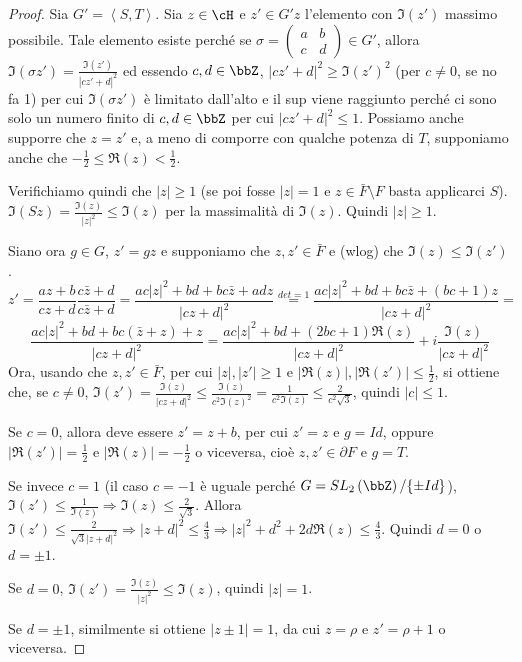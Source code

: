 \begin{proof}
Sia $G'=\left\langle S,T \right\rangle$. Sia $z \in \cH$ e $z' \in G'z$ l'elemento con $\Im(z')$ massimo possibile. Tale elemento esiste perché se
$\sigma = \left( \begin{array}{cc} a & b \\ c & d \end{array} \right) \in G'$,
allora $\Im(\sigma z') = \frac{\Im(z')}{|cz'+d|^2}$ ed essendo
$c,d \in \bbZ$, $|cz'+d|^2 \geq \Im(z')^2$ (per $c \neq 0$, se no fa 1) per cui $\Im(\sigma z')$ è limitato dall'alto e il sup viene raggiunto perché
ci sono solo un numero finito di $c,d \in \bbZ$ per cui
$|cz'+d|^2 \leq 1$.
Possiamo anche supporre che $z=z'$ e, a meno di comporre con qualche potenza
di $T$, supponiamo anche che $-\frac{1}{2} \leq \Re(z) < \frac{1}{2}$.

Verifichiamo quindi che $|z| \geq 1$ (se poi fosse $|z|=1$ e
$z \in \bar{F} \setminus F$ basta applicarci $S$).
$\Im(Sz) = \frac{\Im(z)}{|z|^2} \leq \Im(z)$ per la massimalità di $\Im(z)$.
Quindi $|z| \geq 1$.


Siano ora $g \in G$, $z'=gz$ e supponiamo che $z,z' \in \bar{F}$ e (wlog)
che $\Im(z) \leq \Im(z')$.
$$
z'= \frac{az+b}{cz+d} \frac{c \bar{z} +d}{c \bar{z} +d} =
\frac{ac|z|^2 + bd + bc \bar{z} + adz}{|cz+d|^2} \stackrel{det=1}{=}
\frac{ac|z|^2 + bd + bc \bar{z} + (bc+1)z}{|cz+d|^2} =
$$
$$
\frac{ac|z|^2 + bd + bc (\bar{z} + z) + z}{|cz+d|^2} =
\frac{ac|z|^2 + bd + (2bc+1) \Re(z)}{|cz+d|^2} + i \frac{\Im(z)}{|cz+d|^2}
$$
Ora, usando che $z,z' \in \bar{F}$, per cui $|z|,|z'| \geq 1$ e
$|\Re(z)|, |\Re(z')| \leq \frac{1}{2}$, si ottiene che, se $c \neq 0$,
$\Im(z') = \frac{\Im(z)}{|cz+d|^2} \leq \frac{\Im(z)}{c^2 \Im(z)^2}
= \frac{1}{c^2 \Im(z)} \leq \frac{2}{c^2 \sqrt{3}}$, quindi $|c| \leq 1$.

Se $c=0$, allora deve essere $z'=z+b$, per cui $z'=z$ e $g=Id$, oppure
$|\Re(z')| = \frac{1}{2}$ e $|\Re(z)| = -\frac{1}{2}$ o viceversa,
cioè $z,z' \in \partial F$ e $g=T$.

Se invece $c=1$ (il caso $c=-1$ è uguale perché
$G=SL_2 \left( \bbZ \right)/\{\pm Id\}$),
$\Im(z') \leq \frac{1}{\Im(z)} \Rightarrow \Im(z) \leq \frac{2}{\sqrt{3}}$.
Allora $\Im(z') \leq \frac{2}{\sqrt{3}|z+d|^2} \Rightarrow
|z+d|^2 \leq \frac{4}{3} \Rightarrow |z|^2+d^2+2d \Re(z) \leq \frac{4}{3}$. 
Quindi $d=0$ o $d=\pm 1$.

Se $d=0$, $\Im(z') = \frac{\Im(z)}{|z|^2} \leq \Im(z)$, quindi $|z|=1$.

Se $d=\pm 1$, similmente si ottiene $|z \pm 1|=1$, da cui $z=\rho$ e
$z'=\rho +1$ o viceversa.


\end{proof}
